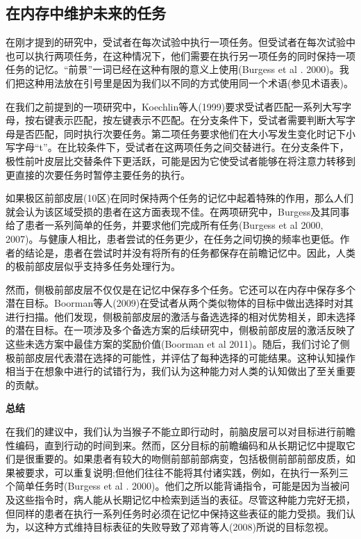 \subsection{在内存中维护未来的任务}
\par
在刚才提到的研究中，受试者在每次试验中执行一项任务。但受试者在每次试验中也可以执行两项任务，在这种情况下，他们需要在执行另一项任务的同时保持一项任务的记忆。“前景”一词已经在这种有限的意义上使用(Burgess et al . 2000)。我们把这种用法放在引号里是因为我们以不同的方式使用同一个术语(参见术语表)。
\par
在我们之前提到的一项研究中，Koechlin等人(1999)要求受试者匹配一系列大写字母，按右键表示匹配，按左键表示不匹配。在分支条件下，受试者需要判断大写字母是否匹配，同时执行次要任务。第二项任务要求他们在大小写发生变化时记下小写字母“t”。在比较条件下，受试者在这两项任务之间交替进行。在分支条件下，极性前叶皮层比交替条件下更活跃，可能是因为它使受试者能够在将注意力转移到更直接的次要任务时暂停主要任务的执行。
\par
如果极区前部皮层(10区)在同时保持两个任务的记忆中起着特殊的作用，那么人们就会认为该区域受损的患者在这方面表现不佳。在两项研究中，Burgess及其同事给了患者一系列简单的任务，并要求他们完成所有任务(Burgess et al 2000, 2007)。与健康人相比，患者尝试的任务更少，在任务之间切换的频率也更低。作者的结论是，患者在尝试时并没有将所有的任务都保存在前瞻记忆中。因此，人类的极前部皮层似乎支持多任务处理行为。
\par
然而，侧极前部皮层不仅仅是在记忆中保存多个任务。它还可以在内存中保存多个潜在目标。Boorman等人(2009)在受试者从两个类似物体的目标中做出选择时对其进行扫描。他们发现，侧极前部皮层的激活与备选选择的相对优势相关，即未选择的潜在目标。在一项涉及多个备选方案的后续研究中，侧极前部皮层的激活反映了这些未选方案中最佳方案的奖励价值(Boorman et al 2011)。随后，我们讨论了侧极前部皮层代表潜在选择的可能性，并评估了每种选择的可能结果。这种认知操作相当于在想象中进行的试错行为，我们认为这种能力对人类的认知做出了至关重要的贡献。
\par
\textbf{总结}
\par
在我们的建议中，我们认为当猴子不能立即行动时，前脑皮层可以对目标进行前瞻性编码，直到行动的时间到来。然而，区分目标的前瞻编码和从长期记忆中提取它们是很重要的。如果患者有较大的吻侧前部前部病变，包括极侧前部前部皮质，如果被要求，可以重复说明;但他们往往不能将其付诸实践，例如，在执行一系列三个简单任务时(Burgess et al . 2000)。他们之所以能背诵指令，可能是因为当被问及这些指令时，病人能从长期记忆中检索到适当的表征。尽管这种能力完好无损，但同样的患者在执行一系列任务时必须在记忆中保持这些表征的能力受损。我们认为，以这种方式维持目标表征的失败导致了邓肯等人(2008)所说的目标忽视。
